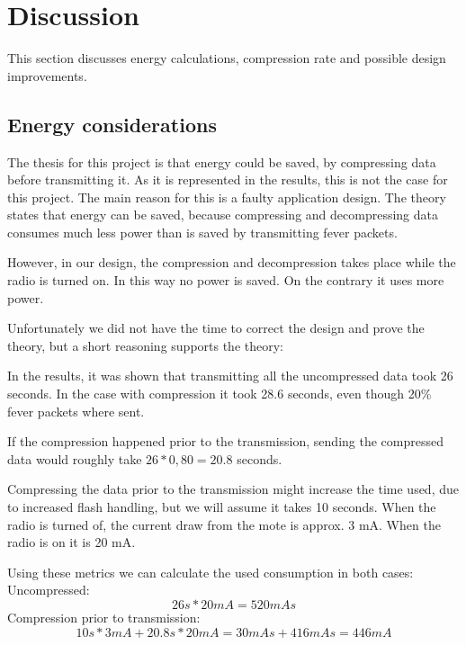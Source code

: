 \chapter{Discussion}

This section discusses energy calculations, compression rate and possible design improvements.  

\section{Energy considerations}

The thesis for this project is that energy could be saved, by compressing data before transmitting it. As it is represented in the results, this is not the case for this project. The main reason for this is a faulty application design. 
The theory states that energy can be saved, because compressing and decompressing data consumes much less power than is saved by transmitting fever packets.

However, in our design, the compression and decompression takes place while the radio is turned on. In this way no power is saved. On the contrary it uses more power.

Unfortunately we did not have the time to correct the design and prove the theory, but a short reasoning supports the theory:


In the results, it was shown that transmitting all the uncompressed data took 26 seconds. In the case with compression it took 28.6 seconds, even though 20\% fever packets where sent. 

If the compression happened prior to the transmission, sending the compressed data would roughly take $26*0,80 = 20.8$ seconds. 

Compressing the data prior to the transmission might increase the time used, due to increased flash handling, but we will assume it takes 10 seconds.
When the radio is turned of, the current draw from the mote is approx. 3 mA. When the radio is on it is 20 mA. 

Using these metrics we can calculate the used consumption in both cases:\\
Uncompressed:
\begin{equation}
26 s * 20 mA = 520 mAs
\end{equation}
Compression prior to transmission:
\begin{equation}
10 s * 3 mA + 20.8 s * 20 mA = 30 mAs + 416 mAs  = 446 mA
\end{equation}

